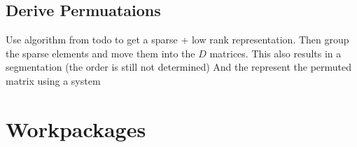 \documentclass[lang=ngerman,inputenc=utf8,fontsize=10pt]{ldvarticle}
\begin{document}
\subsection*{Derive Permuataions}
Use algorithm from todo to get a sparse + low rank representation.
Then group the sparse elements and move them into the $D$ matrices.
This also results in a segmentation (the order is still not determined)
And the represent the permuted matrix using a system 


%
%



\section{Workpackages}
\end{document}
